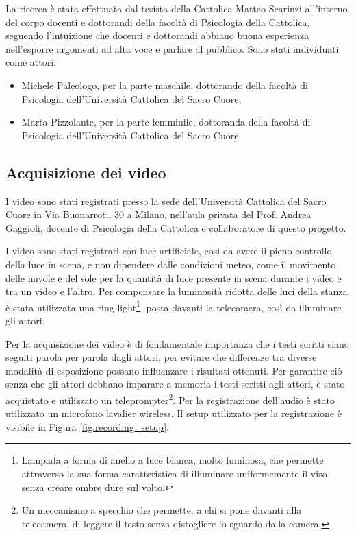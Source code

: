 La ricerca è stata effettuata dal tesista della Cattolica Matteo Scarinzi all'interno del corpo docenti e dottorandi della facoltà di Psicologia della Cattolica, seguendo l'intuizione che docenti e dottorandi abbiano buona esperienza nell'esporre argomenti ad alta voce e parlare al pubblico. Sono stati individuati come attori:
\begin{itemize}
    \item Michele Paleologo, per la parte maschile, dottorando della facoltà di Psicologia dell'Università Cattolica del Sacro Cuore,
    \item Marta Pizzolante, per la parte femminile, dottoranda della facoltà di Psicologia dell'Università Cattolica del Sacro Cuore.
\end{itemize}

\subsection{Acquisizione dei video}

I video sono stati registrati presso la sede dell'Università Cattolica del Sacro Cuore in Via Buonarroti, 30 a Milano, nell'aula privata del Prof. Andrea Gaggioli, docente di Psicologia della Cattolica e collaboratore di questo progetto.

I video sono stati registrati con luce artificiale, così da avere il pieno controllo della luce in scena, e non dipendere dalle condizioni meteo, come il movimento delle nuvole e del sole per la quantità di luce presente in scena durante i video e tra un video e l'altro. Per compensare la luminosità ridotta delle luci della stanza è stata utilizzata una ring light\footnote{Lampada a forma di anello a luce bianca, molto luminosa, che permette attraverso la sua forma caratteristica di illuminare uniformemente il viso senza creare ombre dure sul volto.}, posta davanti la telecamera, così da illuminare gli attori.

Per la acquisizione dei video è di fondamentale importanza che i testi scritti siano seguiti parola per parola dagli attori, per evitare che differenze tra diverse modalità di esposizione possano influenzare i risultati ottenuti. Per garantire ciò senza che gli attori debbano imparare a memoria i testi scritti agli attori, è stato acquistato e utilizzato un teleprompter\footnote{Un meccanismo a specchio che permette, a chi si pone davanti alla telecamera, di leggere il testo senza distogliere lo sguardo dalla camera.}. Per la registrazione dell'audio è stato utilizzato un microfono lavalier wireless. Il setup utilizzato per la registrazione è visibile in Figura \ref{fig:recording_setup}.

